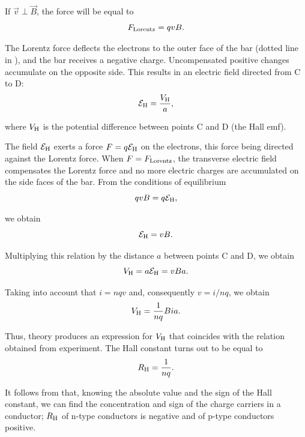 \noindent
If $\vec{v}\perp\vec{B}$, the force will be equal to
\begin{equation*}
    F_{\text{Lorentz}} = q v B.
\end{equation*}

The Lorentz force deflects the electrons to the outer face of the bar (dotted line in ), and the bar receives a negative charge. Uncompensated positive changes accumulate on the opposite side. This results in an electric field directed from C to D:
\begin{equation*}
    \mathcal{E}_{\text{H}} = \frac{V_{\text{H}}}{a},
\end{equation*}

\noindent
where $V_{\text{H}}$ is the potential difference between points C and D (the Hall emf).

The field $\mathcal{E}_{\text{H}}$ exerts a force $F=q\mathcal{E}_{\text{H}}$ on the electrons, this force being directed against the Lorentz force. When $F=F_{\text{Lorentz}}$, the transverse electric field compensates the Lorentz force and no more electric charges are accumulated on the side faces of the bar. From the conditions of equilibrium
\begin{equation}\label{eq:9_33}
    q v B = q \mathcal{E}_{\text{H}},
\end{equation}

\noindent
we obtain
\begin{equation*}
    \mathcal{E}_{\text{H}} = v B.
\end{equation*}

\noindent
Multiplying this relation by the distance $a$ between points C and D, we obtain
\begin{equation*}
    V_{\text{H}} = a \mathcal{E}_{\text{H}} = vBa.
\end{equation*}

\noindent
Taking into account that $i=nqv$ and, consequently $v=i/nq$, we obtain
\begin{equation}\label{eq:9_34}
    V_{\text{H}} = \frac{1}{nq} B i a.
\end{equation}

Thus, theory produces an expression for $V_{\text{H}}$ that coincides with the relation  obtained from experiment. The Hall constant turns out to be equal to
\begin{equation}\label{eq:9_35}
    R_{\text{H}} = \frac{1}{nq}.
\end{equation}

\noindent
It follows from  that, knowing the absolute value and the sign of the Hall constant, we can find the concentration and sign of the charge carriers in a conductor; $R_{\text{H}}$ of n-type conductors is negative and of p-type conductors positive.

